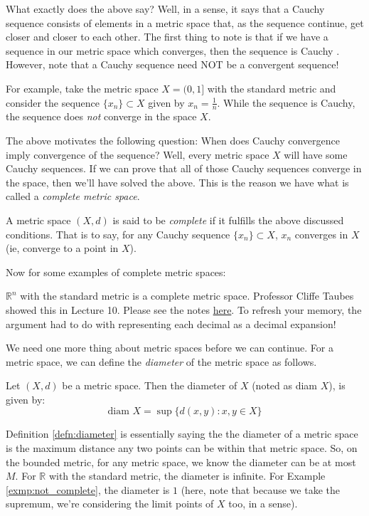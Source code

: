 \documentclass[english, 11pt]{article}
\begin{document}
  What exactly does the above say? Well, in a sense, it says that a Cauchy sequence consists of elements in a metric space that, as the sequence continue, get closer and closer to each other. The first thing to note is that if we have a sequence in our metric space which converges, then the sequence is Cauchy \cite{complete_metric_spaces}. \\

  However, note that a Cauchy sequence need NOT be a convergent sequence!

  \begin{exmp}
  \label{exmp:not_complete}
  For example, take the metric space $X = (0,1]$ with the standard metric and consider the sequence $\{x_n\} \subset X$ given by $x_n = \frac{1}{n}$. While the sequence is Cauchy, the sequence does \textit{not} converge in the space $X$.
  \end{exmp}

  The above motivates the following question: When does Cauchy convergence imply convergence of the sequence? Well, every metric space $X$ will have some Cauchy sequences. If we can prove that all of those Cauchy sequences converge in the space, then we'll have solved the above. This is the reason we have what is called a \textit{complete metric space}.

  \begin{defn}
  A metric space $(X,d)$ is said to be \textit{complete} if it fulfills the above discussed conditions. That is to say, for any Cauchy sequence $\{x_n\} \subset X$, $x_n$ converges in $X$ (ie, converge to a point in $X$).
  \end{defn}

  Now for some examples of complete metric spaces:
  \begin{exmp}
  \label{exmp:rn_complete_metric_space}
  $\mathbb{R}^n$ with the standard metric is a complete metric space. Professor Cliffe Taubes showed this in Lecture 10. Please see the notes \href{https://canvas.harvard.edu/courses/4012/files/1066212/download?wrap=1}{here}. To refresh your memory, the argument had to do with representing each decimal as a decimal expansion!
  \end{exmp}

  We need one more thing about metric spaces before we can continue. For a metric space, we can define the \textit{diameter} of the metric space as follows.
  \begin{defn}
  \label{defn:diameter}
  Let $(X,d)$ be a metric space. Then the diameter of $X$ (noted as diam $X$), is given by:
  $$
    \text{diam } X = \sup \{d(x,y) : x,y \in X \}
  $$
  \end{defn}
  Definition \ref{defn:diameter} is essentially saying the the diameter of a metric space is the maximum distance any two points can be within that metric space. So, on the bounded metric, for any metric space, we know the diameter can be at most $M$. For $\mathbb{R}$ with the standard metric, the diameter is infinite. For Example \ref{exmp:not_complete}, the diameter is $1$ (here, note that because we take the supremum, we're considering the limit points of $X$ too, in a sense).\\
\end{document}

